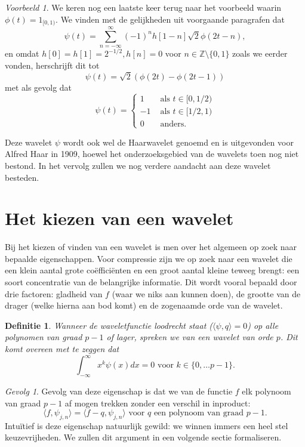 \documentclass[11pt]{report}
\newcommand{\Z}{\mathbb{Z}}
\theoremstyle{plain}
\newtheorem*{definitie}{Definitie}
\theoremstyle{remark}
\newtheorem*{gevolg}{Gevolg}
\newtheorem*{voorbeeld}{Voorbeeld}
\begin{document}
\begin{voorbeeld}
We keren nog een laatste keer terug naar het voorbeeld waarin $\phi(t) = 1_{[0,1)}$. We vinden met de gelijkheden uit voorgaande paragrafen dat
\[
\psi\left(t\right) = \sum_{n=-\infty}^{\infty} (-1)^{n}h[1-n] \sqrt{2}\phi(2t-n),
\]
en omdat $h[0] = h[1] = 2^{-1/2}, h[n] = 0$ voor $n \in \Z \setminus \{0,1\}$ zoals we eerder vonden, herschrijft dit tot
\[
\psi\left(t\right) = \sqrt{2}\left(\phi(2t) - \phi(2t - 1)\right)
\]
met als gevolg dat
\[
	\psi(t) = \begin{cases} 1 & \text{ als } t \in [0,1/2) \\ -1 & \text{ als } t \in [1/2,1) \\ 0 & \text{ anders.} \end{cases}
\]

Deze wavelet $\psi$ wordt ook wel de Haarwavelet genoemd en is uitgevonden voor Alfred Haar in 1909, hoewel het onderzoeksgebied van de wavelets toen nog niet bestond. In het vervolg zullen we nog verdere aandacht aan deze wavelet besteden.
\end{voorbeeld}

\section{Het kiezen van een wavelet}
Bij het kiezen of vinden van een wavelet is men over het algemeen op zoek naar bepaalde eigenschappen. Voor compressie zijn we op zoek naar een wavelet die een klein aantal grote co\"effici\"enten en een groot aantal kleine teweeg brengt: een soort concentratie van de belangrijke informatie. Dit wordt vooral bepaald door drie factoren: gladheid van $f$ (waar we niks aan kunnen doen), de grootte van de drager (welke hierna aan bod komt) en de zogenaamde orde van de wavelet.

\begin{definitie}
Wanneer de waveletfunctie loodrecht staat ($\langle \psi, q\rangle = 0$) op alle polynomen van graad $p-1$ of lager, spreken we van een wavelet van orde $p$. Dit komt overeen met te zeggen dat
\[
	\int_{-\infty}^\infty x^k \psi(x) dx = 0 \text{ voor } k \in \{ 0, \ldots p-1 \}.
\]
\end{definitie}

\begin{gevolg}
Gevolg van deze eigenschap is dat we van de functie $f$ elk polynoom van graad $p-1$ af mogen trekken zonder een verschil in inproduct:
\[
	\langle f, \psi_{j,n} \rangle = \langle f - q, \psi_{j,n} \rangle \text{ voor $q$ een polynoom van graad $p-1$}. 
\]
Intu\"itief is deze eigenschap natuurlijk gewild: we winnen immers een heel stel keuzevrijheden. We zullen dit argument in een volgende sectie formaliseren.
\end{gevolg}
\end{document}

